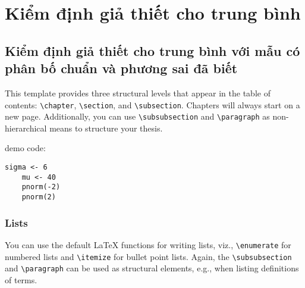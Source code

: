 \chapter{Kiểm định giả thiết cho trung bình}

\section{Kiểm định giả thiết cho trung bình với mẫu có phân bố chuẩn và phương sai đã biết}
This template provides three structural levels that appear in the table of contents: \texttt{\textbackslash chapter}, \texttt{\textbackslash section}, and \texttt{\textbackslash subsection}. Chapters will always start on a new page. Additionally, you can use \texttt{\textbackslash subsubsection} and \texttt{\textbackslash paragraph} as non-hierarchical means to structure your thesis.

demo code: 
\begin{lstlisting}[]
    sigma <- 6
    mu <- 40
    pnorm(-2)
    pnorm(2)
\end{lstlisting}



\subsection{Lists}
You can use the default \LaTeX \- functions for writing lists, viz., \texttt{\textbackslash enumerate} for numbered lists and \texttt{\textbackslash itemize} for bullet point lists. Again, the \texttt{\textbackslash subsubsection} and \texttt{\textbackslash paragraph} can be used as structural elements, e.g., when listing definitions of terms.


